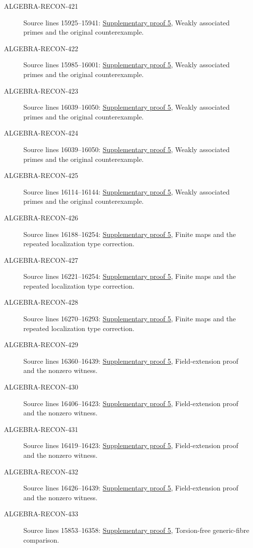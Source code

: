 \begin{description}
\item[ALGEBRA-RECON-421] Source lines 15925--15941: \hyperlink{algebra_symbolic_weakass_notes_20260927}{Supplementary proof 5}, Weakly associated primes and the original counterexample.
\item[ALGEBRA-RECON-422] Source lines 15985--16001: \hyperlink{algebra_symbolic_weakass_notes_20260927}{Supplementary proof 5}, Weakly associated primes and the original counterexample.
\item[ALGEBRA-RECON-423] Source lines 16039--16050: \hyperlink{algebra_symbolic_weakass_notes_20260927}{Supplementary proof 5}, Weakly associated primes and the original counterexample.
\item[ALGEBRA-RECON-424] Source lines 16039--16050: \hyperlink{algebra_symbolic_weakass_notes_20260927}{Supplementary proof 5}, Weakly associated primes and the original counterexample.
\item[ALGEBRA-RECON-425] Source lines 16114--16144: \hyperlink{algebra_symbolic_weakass_notes_20260927}{Supplementary proof 5}, Weakly associated primes and the original counterexample.
\item[ALGEBRA-RECON-426] Source lines 16188--16254: \hyperlink{algebra_symbolic_weakass_notes_20260927}{Supplementary proof 5}, Finite maps and the repeated localization type correction.
\item[ALGEBRA-RECON-427] Source lines 16221--16254: \hyperlink{algebra_symbolic_weakass_notes_20260927}{Supplementary proof 5}, Finite maps and the repeated localization type correction.
\item[ALGEBRA-RECON-428] Source lines 16270--16293: \hyperlink{algebra_symbolic_weakass_notes_20260927}{Supplementary proof 5}, Finite maps and the repeated localization type correction.
\item[ALGEBRA-RECON-429] Source lines 16360--16439: \hyperlink{algebra_symbolic_weakass_notes_20260927}{Supplementary proof 5}, Field-extension proof and the nonzero witness.
\item[ALGEBRA-RECON-430] Source lines 16406--16423: \hyperlink{algebra_symbolic_weakass_notes_20260927}{Supplementary proof 5}, Field-extension proof and the nonzero witness.
\item[ALGEBRA-RECON-431] Source lines 16419--16423: \hyperlink{algebra_symbolic_weakass_notes_20260927}{Supplementary proof 5}, Field-extension proof and the nonzero witness.
\item[ALGEBRA-RECON-432] Source lines 16426--16439: \hyperlink{algebra_symbolic_weakass_notes_20260927}{Supplementary proof 5}, Field-extension proof and the nonzero witness.
\item[ALGEBRA-RECON-433] Source lines 15853--16358: \hyperlink{algebra_symbolic_weakass_notes_20260927}{Supplementary proof 5}, Torsion-free generic-fibre comparison.
\end{description}

